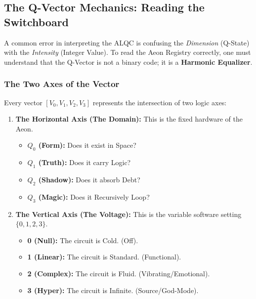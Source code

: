 \documentclass[12pt]{amsart}
\begin{document}
\subsection{The Q-Vector Mechanics: Reading the Switchboard}
\label{sec:q_vector_deep_dive}

A common error in interpreting the ALQC is confusing the \textit{Dimension} (Q-State) with the \textit{Intensity} (Integer Value). To read the Aeon Registry correctly, one must understand that the Q-Vector is not a binary code; it is a \textbf{Harmonic Equalizer}.

\subsubsection{The Two Axes of the Vector}
Every vector $[V_0, V_1, V_2, V_3]$ represents the intersection of two logic axes:

\begin{enumerate}
    \item \textbf{The Horizontal Axis (The Domain):} This is the fixed hardware of the Aeon.
    \begin{itemize}
        \item \textbf{$Q_0$ (Form):} Does it exist in Space?
        \item \textbf{$Q_1$ (Truth):} Does it carry Logic?
        \item \textbf{$Q_2$ (Shadow):} Does it absorb Debt?
        \item \textbf{$Q_3$ (Magic):} Does it Recursively Loop?
    \end{itemize}
    
    \item \textbf{The Vertical Axis (The Voltage):} This is the variable software setting $\{0, 1, 2, 3\}$.
    \begin{itemize}
        \item \textbf{0 (Null):} The circuit is Cold. (Off).
        \item \textbf{1 (Linear):} The circuit is Standard. (Functional).
        \item \textbf{2 (Complex):} The circuit is Fluid. (Vibrating/Emotional).
        \item \textbf{3 (Hyper):} The circuit is Infinite. (Source/God-Mode).
    \end{itemize}
\end{enumerate}
\end{document}
